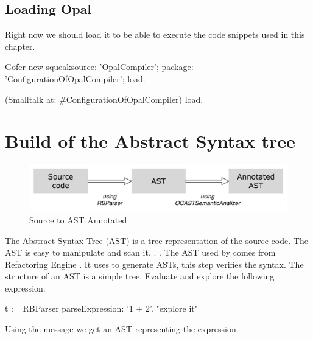 \documentclass[a4paper,10pt,twoside]{book}
\begin{document}
\subsection{Loading Opal}

Right now we should load it to be able to execute the code snippets used in this chapter.
\begin{code}{}
	Gofer new
		squeaksource: 'OpalCompiler';
		package: 'ConfigurationOfOpalCompiler';
		load.
		
	(Smalltalk at: #ConfigurationOfOpalCompiler) load.
\end{code}


\section{Build of the Abstract Syntax tree}

\begin{figure}[ht]\centering
	\includegraphics[width=\linewidth]{SourceToAnnotatedAST}
	\caption{Source to AST Annotated  }
\end{figure}

The Abstract Syntax Tree (AST) is a tree representation of the source code. The AST is easy to manipulate and scan it.
. .
The AST used by \opal comes from Refactoring Engine . It uses  to generate ASTs, this step verifies the syntax. The structure of an AST is a simple tree. Evaluate and explore the following expression:

\begin{code}{}
t := RBParser parseExpression: '1 + 2'.
"explore it"

\end{code}


Using the message  we get an AST representing the expression.
\end{document}
